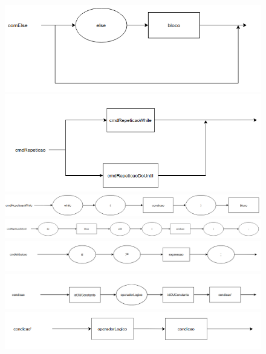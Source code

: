 \documentclass[11pt]{article}
\begin{document}
\begin{figure}[H]
    \includegraphics[scale=2.5]{grafos_sintaticos/com_else.png}

    \includegraphics[scale=2.5]{grafos_sintaticos/cmd_repeticao.png}

    \includegraphics[scale=1.6]{grafos_sintaticos/cmd_repeticao_while.png}

    \includegraphics[scale=1.3]{grafos_sintaticos/cmd_repeticao_do_until.png}

    \includegraphics[scale=1.3]{grafos_sintaticos/cmd_atribuicao.png}

    \includegraphics[scale=1.5]{grafos_sintaticos/condicao.png}

    \includegraphics[scale=2.3]{grafos_sintaticos/condicao'.png}

    
\end{figure}
\end{document}
